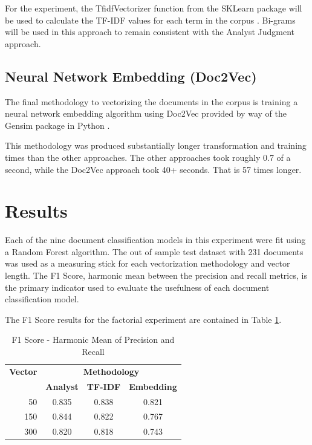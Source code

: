\documentclass[5p,authoryear]{elsarticle}
\begin{document}
For the experiment, the TfidfVectorizer function from the SKLearn package will be used to calculate the TF-IDF values for each term in the corpus \citep{tfidf}. 
Bi-grams will be used in this approach to remain consistent with the Analyst Judgment approach.


\subsection{Neural Network Embedding (Doc2Vec)}\label{exploration}

The final methodology to vectorizing the documents in the corpus is training a neural network embedding algorithm using Doc2Vec provided by way of the Gensim package in Python \citep{gensim}. 

This methodology was produced substantially longer transformation and training times than the other approaches. The other approaches took roughly 0.7 of a second, while the Doc2Vec approach took 40+ seconds. That is 57 times longer.

\section{Results}

Each of the nine document classification models in this experiment were fit using a Random Forest algorithm.
The out of sample test dataset with 231 documents was used as a measuring stick for each vectorization methodology and vector length. 
The F1 Score, harmonic mean between the precision and recall metrics, is the primary indicator used to evaluate the usefulness of each document classification model. 

The F1 Score results for the factorial experiment are contained in Table \ref{table_eval}.


\begin{center}
\begin{table}[!htb] 
  \centering 
  \begin{tabular}{r|c c c} %
    \toprule %
    \footnotesize \textbf{Vector} & \multicolumn{3}{c}{\textbf{Methodology}} \\
    {\footnotesize \textbf{Length} & {\footnotesize \textbf{Analyst}} &  {\footnotesize \textbf{TF-IDF}} & {\footnotesize \textbf{Embedding}}} \\
    \midrule
    50 & 0.835 & 0.838 & 0.821 \\
    150 & 0.844 & 0.822 & 0.767 \\
    300 & 0.820 & 0.818 & 0.743 \\
    \bottomrule
\end{tabular} \caption{F1 Score - Harmonic Mean of Precision and Recall} 
\label{table_eval}
\end{table}
\end{center}
\end{document}
